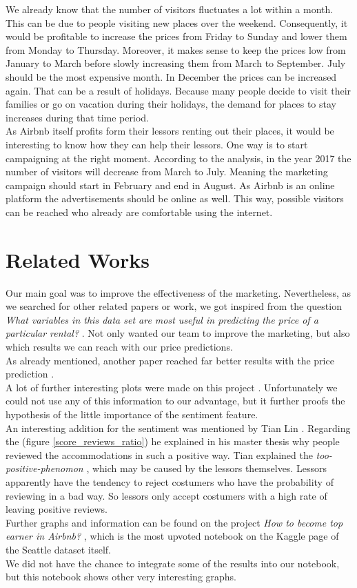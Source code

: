 \documentclass[journal]{IEEEtran}
\begin{document}
We already know that the number of visitors fluctuates a lot within a month. This can be due to people visiting new places over the weekend. Consequently, it would be profitable to increase the prices from Friday to Sunday and lower them from Monday to Thursday. Moreover, it makes sense to keep the prices low from January to March before slowly increasing them from March to September. July should be the most expensive month. In December the prices can be increased again. That can be a result of holidays. Because many people decide to visit their families or go on vacation during their holidays, the demand for places to stay increases during that time period. \\
As Airbnb itself profits form their lessors renting out their places, it would be interesting to know how they can help their lessors. One way is to start campaigning at the right moment. According to the analysis, in the year 2017 the number of visitors will decrease from March to July. Meaning the marketing campaign should start in February and end in August. As Airbnb is an online platform the advertisements should be online as well. This way, possible visitors can be reached who already are comfortable using the internet. 
%
\section{Related Works}
\noindent Our main goal was to improve the effectiveness of the marketing. Nevertheless, as we searched for other related papers or work, we got inspired from the question \textit{What variables in this data set are most useful in predicting the price of a particular rental?} \cite{RN2}. Not only wanted our team to improve the marketing, but also which results we can reach with our price predictions. \\
 As already mentioned, another paper reached far better results with the price prediction \cite{RN1}. \\
 A lot of further interesting plots were made on this project \cite{RN4}. Unfortunately we could not use any of this information to our advantage, but it further proofs the hypothesis of the little importance of the sentiment feature. \\
 An interesting addition for the sentiment was mentioned by Tian Lin \cite{RN3}. Regarding the (figure \ref{score_reviews_ratio}) he explained in his master thesis why people reviewed the accommodations in such a positive way. Tian explained the \textit{too-positive-phenomon} \cite{RN3}, which may be caused by the lessors themselves. Lessors apparently have the tendency to reject costumers who have the probability of reviewing in a bad way. So lessors only accept costumers with a high rate of leaving positive reviews. \\
 Further graphs and information can be found on the project \textit{How to become top earner in Airbnb?} \cite{RN5}, which is the most upvoted notebook on the Kaggle page of the Seattle dataset itself. \\
 We did not have the chance to integrate some of the results into our notebook, but this notebook shows other very interesting graphs. 
 
\end{document}
